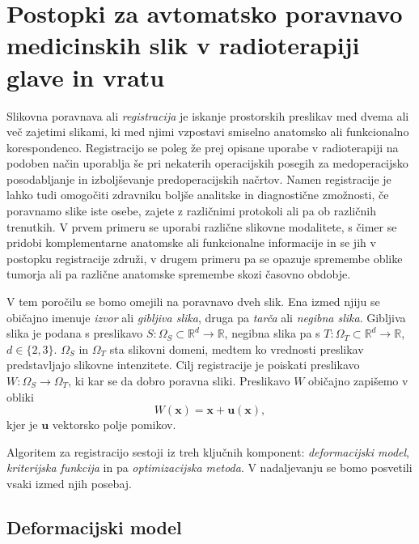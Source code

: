 \documentclass[journal]{IEEEtran}
\begin{document}
\section{Postopki za avtomatsko poravnavo medicinskih slik v radioterapiji glave in vratu}

Slikovna poravnava ali \emph{registracija} je iskanje prostorskih preslikav med dvema ali več zajetimi slikami, ki med njimi vzpostavi smiselno anatomsko ali funkcionalno korespondenco. Registracijo se poleg že prej opisane uporabe v radioterapiji na podoben način uporablja še pri nekaterih operacijskih posegih za medoperacijsko posodabljanje in izboljševanje predoperacijskih načrtov. Namen registracije je lahko tudi omogočiti zdravniku boljše analitske in diagnostične zmožnosti, če poravnamo slike iste osebe, zajete z različnimi protokoli ali pa ob različnih trenutkih. V prvem primeru se uporabi različne slikovne modalitete, s čimer se pridobi komplementarne anatomske ali funkcionalne informacije in se jih v postopku registracije združi, v drugem primeru pa se opazuje spremembe oblike tumorja ali pa različne anatomske spremembe skozi časovno obdobje.

V tem poročilu se bomo omejili na poravnavo dveh slik. Ena izmed njiju se običajno imenuje \emph{izvor} ali \emph{gibljiva slika}, druga pa \emph{tarča} ali \emph{negibna slika}. Gibljiva slika je podana s preslikavo $S\colon\Omega_S\subset\mathbb{R}^d\to\mathbb{R}$, negibna slika pa s $T\colon\Omega_T\subset\mathbb{R}^d\to\mathbb{R}$, $d\in\{2,3\}$. $\Omega_S$ in $\Omega_T$ sta slikovni domeni, medtem ko vrednosti preslikav predstavljajo slikovne intenzitete. Cilj registracije je poiskati preslikavo $W\colon\Omega_S\to\Omega_T$, ki kar se da dobro poravna sliki. Preslikavo $W$ običajno zapišemo v obliki
\begin{equation}
 W(\boldsymbol{x}) = \boldsymbol{x} + \boldsymbol{u}(\boldsymbol{x}),
\end{equation}
kjer je $\boldsymbol{u}$ vektorsko polje pomikov.

Algoritem za registracijo sestoji iz treh ključnih komponent: \emph{deformacijski model}, \emph{kriterijska funkcija} in pa \emph{optimizacijska metoda}. V nadaljevanju se bomo posvetili vsaki izmed njih posebaj.

\subsection{Deformacijski model}
\end{document}
